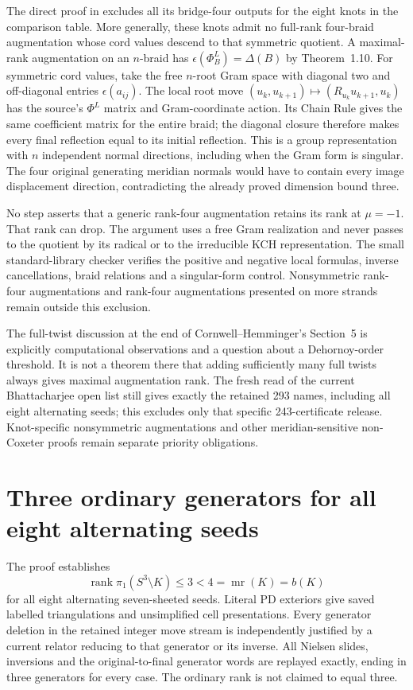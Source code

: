 \documentclass[11pt]{article}
\newcommand{\mr}{\operatorname{mr}}
\begin{document}
The direct proof in 
excludes all its bridge-four outputs for the eight knots
in the comparison table.
More generally, these knots admit no full-rank four-braid augmentation
whose cord values descend to that symmetric quotient. A maximal-rank
augmentation on an $n$-braid has
$\epsilon(\Phi_B^L)=\Delta(B)$ by Theorem~1.10.
For symmetric cord values, take the free $n$-root Gram space with
diagonal two and off-diagonal entries $\epsilon(a_{ij})$.
The local root move $(u_k,u_{k+1})\mapsto(R_{u_k}u_{k+1},u_k)$
has the source's $\Phi^L$ matrix and Gram-coordinate action.
Its Chain Rule gives the same coefficient matrix for the entire braid;
the diagonal closure therefore makes every final reflection equal to
its initial reflection. This is a group representation with $n$
independent normal directions, including when the Gram form is singular.
The four original generating meridian normals would have to contain
every image displacement direction, contradicting the already proved
dimension bound three.

No step asserts that a generic rank-four augmentation retains its
rank at $\mu=-1$. That rank can drop. The argument uses a free
Gram realization and never passes to the quotient by its radical
or to the irreducible KCH representation. The small standard-library
checker verifies the positive and negative local formulas, inverse
cancellations, braid relations and a singular-form control.
Nonsymmetric rank-four augmentations and rank-four augmentations
presented on more strands remain outside this exclusion.

The full-twist discussion at the end of Cornwell--Hemminger's
Section~5 \cite{ch} is explicitly computational observations and
a question about a Dehornoy-order threshold. It is not a theorem
there that adding sufficiently many full twists always gives
maximal augmentation rank. The fresh read of the current
Bhattacharjee open list still gives exactly the retained 293 names,
including all eight alternating seeds; this excludes only that specific
243-certificate release. Knot-specific nonsymmetric augmentations
and other meridian-sensitive non-Coxeter proofs remain separate
priority obligations.

\section{Three ordinary generators for all eight alternating seeds}

The proof  establishes
\[
 \operatorname{rank}\pi_1(S^3\setminus K)\le3<4=\mr(K)=b(K)
\]
for all eight alternating seven-sheeted seeds. Literal PD exteriors
give saved labelled triangulations and unsimplified cell presentations.
Every generator deletion in the retained integer move stream is
independently justified by a current relator reducing to that
generator or its inverse. All Nielsen slides, inversions and the
original-to-final generator words are replayed exactly, ending in
three generators for every case. The ordinary rank is not claimed
to equal three.
\end{document}
